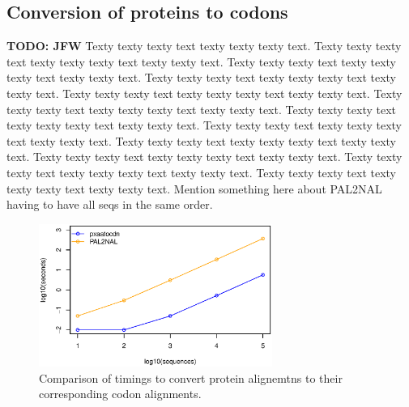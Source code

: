 \documentclass{article}
\begin{document}
\subsection{Conversion of proteins to codons}
\textbf{TODO: JFW} Texty texty texty text texty texty texty text.
Texty texty texty text texty texty texty text texty texty text.
Texty texty texty text texty texty texty text texty texty text.
Texty texty texty text texty texty texty text texty texty text.
Texty texty texty text texty texty texty text texty texty text.
Texty texty texty text texty texty texty text texty texty text.
Texty texty texty text texty texty texty text texty texty text.
Texty texty texty text texty texty texty text texty texty text.
Texty texty texty text texty texty texty text texty texty text.
Texty texty texty text texty texty texty text texty texty text.
Texty texty texty text texty texty texty text texty texty text.
Texty texty texty text texty texty texty text texty texty text.
Mention something here about PAL2NAL \cite{Suyama2006} having to
have all seqs in the same order.

\begin{figure}[!h]
    \centering
    \includegraphics[width=3.0in]{aatocdn}
    \caption{Comparison of timings to convert protein alignemtns to
    their corresponding codon alignments.}
    \label{proteincodonfigure}
\label{fig:S2}
\end{figure}
\end{document}
